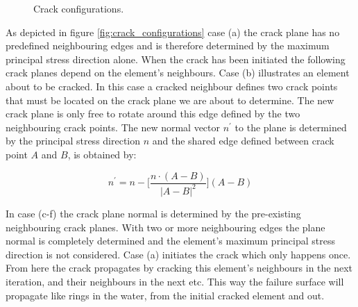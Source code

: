 \begin{figure}[h]
{  \label{fig:crack_configuration_4}}
 \caption{Crack configurations.}
 \label{fig:crack_configurations}
\end{figure}

As depicted in figure \vref{fig:crack_configurations} case (a) the
crack plane has no predefined neighbouring edges and is therefore
determined by the maximum principal stress direction alone. When the crack
has been initiated the following crack planes depend on the
element's neighbours. Case (b)
illustrates an element about to be 
cracked. In this case a cracked neighbour defines two crack points
that must be located on the crack plane we are about to determine. The
new crack plane is only free to rotate around this edge defined by the
two neighbouring crack points.
The new normal vector $n^{\prime}$ to the plane is determined by the principal stress
direction $n$ and the shared edge defined between crack point $A$ and $B$,
is obtained by:

\begin{equation}
n^{\prime} = n - \biggl[ \frac{n \cdot (A - B)}{|A - B|^2} \biggr] (A - B)
\end{equation}

In case (c-f) the crack plane normal is determined by the pre-existing
neighbouring crack planes. With two or more neighbouring edges the
plane normal is completely determined and the element's maximum
principal stress direction is not considered. Case (a) initiates the
crack which only happens once. From here the crack propagates by
cracking this element's neighbours in the next iteration, and their
neighbours in the next etc. This way the failure surface will
propagate like rings in the water, from the initial cracked element
and out. 
